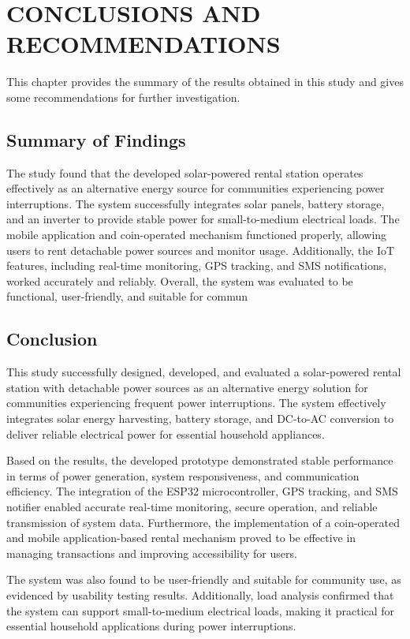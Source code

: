 \chapter{CONCLUSIONS AND RECOMMENDATIONS}
{\baselineskip

This chapter provides the summary of the results obtained in this study and gives some recommendations for further investigation.

\section{Summary of Findings}

The study found that the developed solar-powered rental station operates effectively as an alternative energy source for communities experiencing power interruptions. The system successfully integrates solar panels, battery storage, and an inverter to provide stable power for small-to-medium electrical loads. The mobile application and coin-operated mechanism functioned properly, allowing users to rent detachable power sources and monitor usage. Additionally, the IoT features, including real-time monitoring, GPS tracking, and SMS notifications, worked accurately and reliably. Overall, the system was evaluated to be functional, user-friendly, and suitable for commun

\section{Conclusion}
This study successfully designed, developed, and evaluated a solar-powered rental station with detachable power sources as an alternative energy solution for communities experiencing frequent power interruptions. The system effectively integrates solar energy harvesting, battery storage, and DC-to-AC conversion to deliver reliable electrical power for essential household appliances.

Based on the results, the developed prototype demonstrated stable performance in terms of power generation, system responsiveness, and communication efficiency. The integration of the ESP32 microcontroller, GPS tracking, and SMS notifier enabled accurate real-time monitoring, secure operation, and reliable transmission of system data. Furthermore, the implementation of a coin-operated and mobile application-based rental mechanism proved to be effective in managing transactions and improving accessibility for users.

The system was also found to be user-friendly and suitable for community use, as evidenced by usability testing results. Additionally, load analysis confirmed that the system can support small-to-medium electrical loads, making it practical for essential household applications during power interruptions.

}
